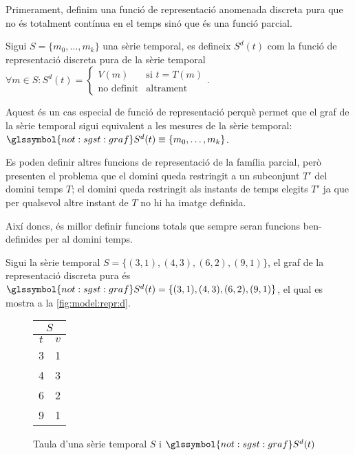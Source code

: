 Primerament, definim una funció de representació anomenada discreta
pura que no és totalment contínua en el temps sinó que és una funció
parcial.
\begin{definition}
  Sigui $S=\{m_0,\ldots,m_k\}$ una sèrie temporal, es defineix
  $S^d(t)$ com la funció de representació discreta pura de la sèrie
  temporal $\forall m \in S: S^d(t) =
  \begin{cases}
    V(m) & \text{si }  t=T(m) \\
    \text{no definit} & \text{altrament}
  \end{cases}$.
\end{definition}

Aquest és un cas especial de funció de representació perquè permet que
el graf de la sèrie temporal sigui equivalent a les mesures de la
sèrie temporal: $\glssymbol{not:sgst:graf} S^d(t) \equiv
\{m_0,\ldots,m_k\}$.

Es poden definir altres funcions de representació de la família
parcial, però presenten el problema que el domini queda restringit a
un subconjunt $T'$ del domini temps $T$; el domini queda restringit
als instants de temps elegits $T'$ ja que per qualsevol altre instant de
$T$ no hi ha imatge definida.

Així doncs, és millor definir funcions totals que sempre seran
funcions ben-definides per al domini temps.



\begin{example}
  Sigui la sèrie temporal $S=\{ (3,1), (4,3), (6,2), (9,1) \}$, el
  graf de la representació discreta pura és $\glssymbol{not:sgst:graf}
  S^d(t)=\{ (3,1), (4,3), (6,2), (9,1) \}$, el qual es mostra a la
  \autoref{fig:model:repr:d}.


  \begin{figure}[tp]
  \centering
  \begin{tabular}[c]{|c|c|}
    \multicolumn{2}{c}{$S$} \\ \hline
    $t$  & $v$ \\ \hline
    3  & 1 \\
    4  & 3 \\
    6  & 2 \\
    9  & 1 \\ \hline
  \end{tabular} \qquad
   \caption{Taula d'una sèrie temporal $S$ i
     $\glssymbol{not:sgst:graf} S^d(t)$}
  \label{fig:model:repr:d}
  \end{figure}
\end{example}




